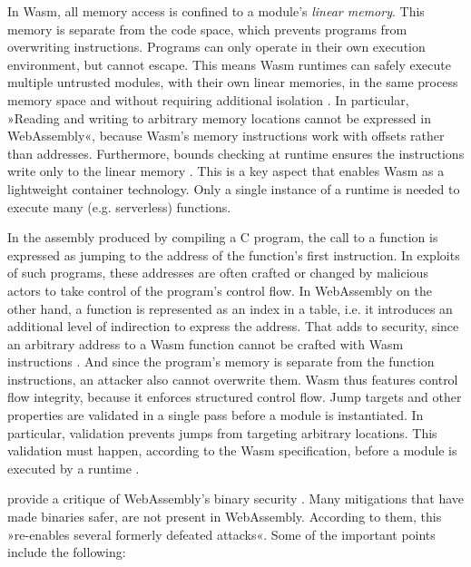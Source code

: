 In Wasm, all memory access is confined to a module's \emph{linear memory}. This memory is separate from the code space, which prevents programs from overwriting instructions. Programs can only operate in their own execution environment, but cannot escape. This means Wasm runtimes can safely execute multiple untrusted modules, with their own linear memories, in the same process memory space and without requiring additional isolation \cite{Haas2017}. In particular, »Reading and writing to arbitrary memory locations cannot be expressed in WebAssembly«, because Wasm's memory instructions work with offsets rather than addresses. Furthermore, bounds checking at runtime ensures the instructions write only to the linear memory \cite{Denis2019}.
This is a key aspect that enables Wasm as a lightweight container technology. Only a single instance of a runtime is needed to execute many (e.g. serverless) functions.

In the assembly produced by compiling a C program, the call to a function is expressed as jumping to the address of the function's first instruction. In exploits of such programs, these addresses are often crafted or changed by malicious actors to take control of the program's control flow. In WebAssembly on the other hand, a function is represented as an index in a table, i.e. it introduces an additional level of indirection to express the address. That adds to security, since an arbitrary address to a Wasm function cannot be crafted with Wasm instructions \cite{Denis2019}. And since the program's memory is separate from the function instructions, an attacker also cannot overwrite them.
Wasm thus features control flow integrity, because it enforces structured control flow. Jump targets and other properties are validated in a single pass before a module is instantiated. In particular, validation prevents jumps from targeting arbitrary locations. This validation must happen, according to the Wasm specification, before a module is executed by a runtime \cite{Haas2017}.

\citeauthor{Lehmann2020} provide a critique of WebAssembly's binary security \cite{Lehmann2020}. Many mitigations that have made  binaries safer, are not present in WebAssembly. According to them, this »re-enables several formerly defeated attacks«. Some of the important points include the following:

